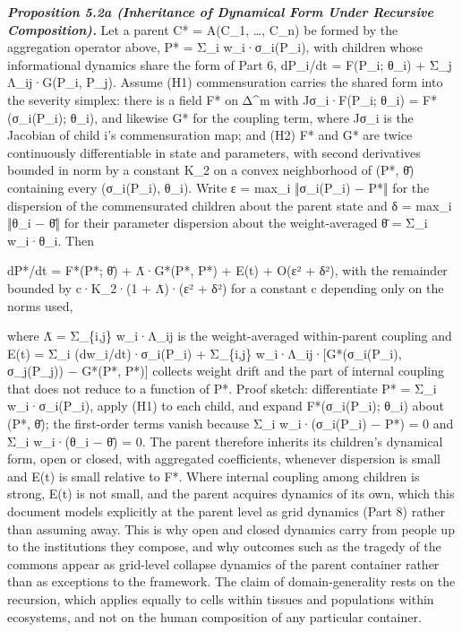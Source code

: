 \documentclass[
]{article}
\begin{document}
\emph{\textbf{Proposition 5.2a (Inheritance of Dynamical Form Under
Recursive Composition).}} Let a parent C* = A(C\_1, \ldots, C\_n) be
formed by the aggregation operator above, P* = Σ\_i w\_i·σ\_i(P\_i),
with children whose informational dynamics share the form of Part 6,
dP\_i/dt = F(P\_i; θ\_i) + Σ\_j Λ\_ij·G(P\_i, P\_j). Assume (H1)
commensuration carries the shared form into the severity simplex: there
is a field F* on Δ\^{}m with Jσ\_i·F(P\_i; θ\_i) = F*(σ\_i(P\_i); θ\_i),
and likewise G* for the coupling term, where Jσ\_i is the Jacobian of
child i's commensuration map; and (H2) F* and G* are twice continuously
differentiable in state and parameters, with second derivatives bounded
in norm by a constant K\_2 on a convex neighborhood of (P*, θ̄)
containing every (σ\_i(P\_i), θ\_i). Write ε = max\_i ‖σ\_i(P\_i) − P*‖
for the dispersion of the commensurated children about the parent state
and δ = max\_i ‖θ\_i − θ̄‖ for their parameter dispersion about the
weight-averaged θ̄ = Σ\_i w\_i·θ\_i. Then

dP*/dt = F*(P*; θ̄) + Λ̄·G*(P*, P*) + E(t) + O(ε² + δ²), with the
remainder bounded by c·K\_2·(1 + Λ̄)·(ε² + δ²) for a constant c depending
only on the norms used,

where Λ̄ = Σ\_\{i,j\} w\_i·Λ\_ij is the weight-averaged within-parent
coupling and E(t) = Σ\_i (dw\_i/dt)·σ\_i(P\_i) + Σ\_\{i,j\}
w\_i·Λ\_ij·{[}G*(σ\_i(P\_i), σ\_j(P\_j)) − G*(P*, P*){]} collects weight
drift and the part of internal coupling that does not reduce to a
function of P*. Proof sketch: differentiate P* = Σ\_i w\_i·σ\_i(P\_i),
apply (H1) to each child, and expand F*(σ\_i(P\_i); θ\_i) about (P*, θ̄);
the first-order terms vanish because Σ\_i w\_i·(σ\_i(P\_i) − P*) = 0 and
Σ\_i w\_i·(θ\_i − θ̄) = 0. The parent therefore inherits its children's
dynamical form, open or closed, with aggregated coefficients, whenever
dispersion is small and E(t) is small relative to F*. Where internal
coupling among children is strong, E(t) is not small, and the parent
acquires dynamics of its own, which this document models explicitly at
the parent level as grid dynamics (Part 8) rather than assuming away.
This is why open and closed dynamics carry from people up to the
institutions they compose, and why outcomes such as the tragedy of the
commons appear as grid-level collapse dynamics of the parent container
rather than as exceptions to the framework. The claim of
domain-generality rests on the recursion, which applies equally to cells
within tissues and populations within ecosystems, and not on the human
composition of any particular container.
\end{document}
